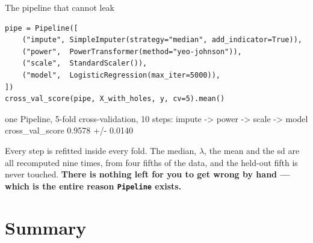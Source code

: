 \documentclass[aspectratio=169]{beamer}
\begin{document}
\begin{frame}[fragile,shrink=4]{The pipeline that cannot leak}
\begin{lstlisting}
pipe = Pipeline([
    ("impute", SimpleImputer(strategy="median", add_indicator=True)),
    ("power",  PowerTransformer(method="yeo-johnson")),
    ("scale",  StandardScaler()),
    ("model",  LogisticRegression(max_iter=5000)),
])
cross_val_score(pipe, X_with_holes, y, cv=5).mean()
\end{lstlisting}
\begin{outblk}
one Pipeline, 5-fold cross-validation, 10%
  steps: impute -> power -> scale -> model
  cross_val_score  0.9578  +/- 0.0140
\end{outblk}
\begin{center}\small
  Every step is refitted inside every fold. The median, $\lambda$, the mean and
  the sd are all recomputed nine times, from four fifths of the data, and the
  held-out fifth is never touched.
  \textbf{There is nothing left for you to get wrong by hand --- which is the
  entire reason \texttt{Pipeline} exists.}
\end{center}
\end{frame}

\section{Summary}
\label{sec:summary}
\end{document}
